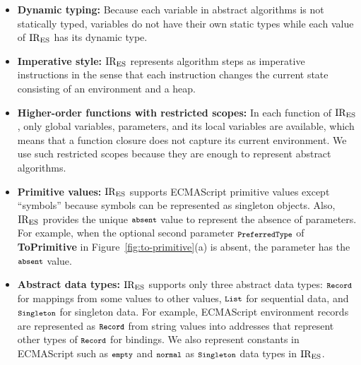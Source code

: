 \begin{itemize}[leftmargin=0.5cm]
\item \textbf{Dynamic typing:} Because each variable in abstract
algorithms is not statically typed, variables do not have their own
static types while each value of \( \text{IR}_\text{ES} \) has its dynamic type.

\item \textbf{Imperative style:} \( \text{IR}_\text{ES} \) represents algorithm steps
as imperative instructions in the sense that each instruction changes
the current state consisting of an environment and a heap.

\item \textbf{Higher-order functions with restricted scopes:}
In each function of \( \text{IR}_\text{ES} \), only global variables, parameters,
and its local variables are available, which means that a function
closure does not capture its current environment.  We use such
restricted scopes because they are enough to represent abstract
algorithms.

\item \textbf{Primitive values:} \( \text{IR}_\text{ES} \) supports ECMAScript
primitive values except ``symbols'' because symbols can be represented
as singleton objects.  Also, \( \text{IR}_\text{ES} \) provides the unique \(
\texttt{\footnotesize absent} \) value to represent the absence of parameters.  For
example, when the optional second parameter \( \texttt{\footnotesize PreferredType} \)
of \textbf{ToPrimitive} in Figure~\ref{fig:to-primitive}(a) is absent,
the parameter has the \( \texttt{\footnotesize absent} \) value.

\item \textbf{Abstract data types:} \( \text{IR}_\text{ES} \) supports only three
abstract data types: \( \texttt{\footnotesize Record} \) for mappings from some values
to other values, \( \texttt{\footnotesize List} \) for sequential data, and
\( \texttt{\footnotesize Singleton} \) for singleton data.  For example, ECMAScript
environment records are represented as \( \texttt{\footnotesize Record} \)
from string values into addresses that represent other types of
\( \texttt{\footnotesize Record} \) for bindings.  We also represent constants
in ECMAScript such as \( \texttt{\footnotesize empty} \)
and \( \texttt{\footnotesize normal} \) as \( \texttt{\footnotesize Singleton} \) data types
in \( \text{IR}_\text{ES} \).
\end{itemize}

